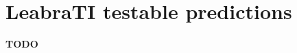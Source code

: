 \documentclass[dwyatte_dissertation.tex]{subfiles}
\begin{document}

\section{LeabraTI testable predictions}
\textbf{TODO}




\end{document}
